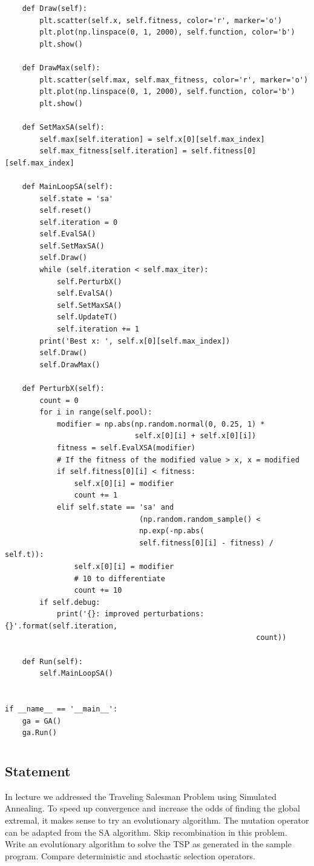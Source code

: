 \documentclass[12pt]{article}
\begin{document}
\begin{lstlisting}
    def Draw(self):        
        plt.scatter(self.x, self.fitness, color='r', marker='o')
        plt.plot(np.linspace(0, 1, 2000), self.function, color='b')
        plt.show()

    def DrawMax(self):
        plt.scatter(self.max, self.max_fitness, color='r', marker='o')
        plt.plot(np.linspace(0, 1, 2000), self.function, color='b')
        plt.show()

    def SetMaxSA(self):
        self.max[self.iteration] = self.x[0][self.max_index]
        self.max_fitness[self.iteration] = self.fitness[0][self.max_index]
        
    def MainLoopSA(self):
        self.state = 'sa'
        self.reset()
        self.iteration = 0
        self.EvalSA()
        self.SetMaxSA()
        self.Draw()
        while (self.iteration < self.max_iter):
            self.PerturbX()
            self.EvalSA()
            self.SetMaxSA()
            self.UpdateT()
            self.iteration += 1
        print('Best x: ', self.x[0][self.max_index])
        self.Draw()
        self.DrawMax()

    def PerturbX(self):
        count = 0
        for i in range(self.pool):
            modifier = np.abs(np.random.normal(0, 0.25, 1) * 
                              self.x[0][i] + self.x[0][i])
            fitness = self.EvalXSA(modifier)
            # If the fitness of the modified value > x, x = modified
            if self.fitness[0][i] < fitness:
                self.x[0][i] = modifier
                count += 1
            elif self.state == 'sa' and 
                               (np.random.random_sample() < 
                               np.exp(-np.abs(
                               self.fitness[0][i] - fitness) / self.t)):
                self.x[0][i] = modifier
                # 10 to differentiate
                count += 10
        if self.debug:
            print('{}: improved perturbations: {}'.format(self.iteration,
                                                          count))

    def Run(self):
        self.MainLoopSA()


if __name__ == '__main__':
    ga = GA()
    ga.Run()
\end{lstlisting}

\newpage
\section{}
\subsection{Statement}
In lecture we addressed the Traveling Salesman Problem using Simulated 
Annealing. To speed up convergence and increase the odds of finding the global 
extremal, it makes sense to try an evolutionary algorithm. The mutation operator 
can be adapted from the SA algorithm. Skip recombination in this problem. Write 
an evolutionary algorithm to solve the TSP as generated in the sample program. 
Compare deterministic and stochastic selection operators. 
\end{document}
